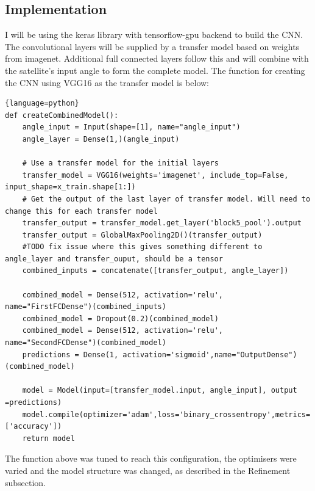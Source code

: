 \documentclass{article}
\begin{document}
\subsection{Implementation}
I will be using the keras library with tensorflow-gpu backend to build the CNN. The convolutional layers will be supplied by a transfer model based on weights from imagenet. Additional full connected layers follow this and will combine with the satellite's input angle to form the complete model. The function for creating the CNN using VGG16 as the transfer model is below:
\begin{lstlisting}{language=python}
def createCombinedModel():
    angle_input = Input(shape=[1], name="angle_input")
    angle_layer = Dense(1,)(angle_input)
    
    # Use a transfer model for the initial layers
    transfer_model = VGG16(weights='imagenet', include_top=False, input_shape=x_train.shape[1:])
    # Get the output of the last layer of transfer model. Will need to change this for each transfer model
    transfer_output = transfer_model.get_layer('block5_pool').output
    transfer_output = GlobalMaxPooling2D()(transfer_output)
    #TODO fix issue where this gives something different to angle_layer and transfer_ouput, should be a tensor
    combined_inputs = concatenate([transfer_output, angle_layer])
    
    combined_model = Dense(512, activation='relu', name="FirstFCDense")(combined_inputs)
    combined_model = Dropout(0.2)(combined_model)
    combined_model = Dense(512, activation='relu', name="SecondFCDense")(combined_model)
    predictions = Dense(1, activation='sigmoid',name="OutputDense")(combined_model)
    
    model = Model(input=[transfer_model.input, angle_input], output =predictions)
    model.compile(optimizer='adam',loss='binary_crossentropy',metrics=['accuracy'])
    return model
\end{lstlisting}
The function above was tuned to reach this configuration, the optimisers were varied and the model structure was changed, as described in the Refinement subsection. 
\end{document}
